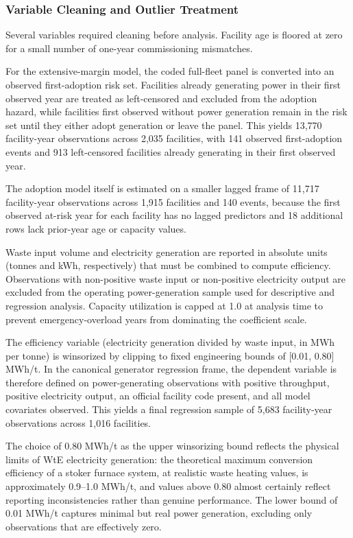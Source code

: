 \documentclass[12pt,a4paper]{article}
\begin{document}
\subsubsection{Variable Cleaning and Outlier Treatment}

Several variables required cleaning before analysis. Facility age is floored at zero for a small number of one-year commissioning mismatches.

For the extensive-margin model, the coded full-fleet panel is converted into an observed first-adoption risk set. Facilities already generating power in their first observed year are treated as left-censored and excluded from the adoption hazard, while facilities first observed without power generation remain in the risk set until they either adopt generation or leave the panel. This yields 13,770 facility-year observations across 2,035 facilities, with 141 observed first-adoption events and 913 left-censored facilities already generating in their first observed year.

The adoption model itself is estimated on a smaller lagged frame of 11,717 facility-year observations across 1,915 facilities and 140 events, because the first observed at-risk year for each facility has no lagged predictors and 18 additional rows lack prior-year age or capacity values.

Waste input volume and electricity generation are reported in absolute units (tonnes and kWh, respectively) that must be combined to compute efficiency. Observations with non-positive waste input or non-positive electricity output are excluded from the operating power-generation sample used for descriptive and regression analysis. Capacity utilization is capped at 1.0 at analysis time to prevent emergency-overload years from dominating the coefficient scale.

The efficiency variable (electricity generation divided by waste input, in MWh per tonne) is winsorized by clipping to fixed engineering bounds of [0.01, 0.80] MWh/t. In the canonical generator regression frame, the dependent variable is therefore defined on power-generating observations with positive throughput, positive electricity output, an official facility code present, and all model covariates observed. This yields a final regression sample of 5,683 facility-year observations across 1,016 facilities.

The choice of 0.80 MWh/t as the upper winsorizing bound reflects the physical limits of WtE electricity generation: the theoretical maximum conversion efficiency of a stoker furnace system, at realistic waste heating values, is approximately 0.9--1.0 MWh/t, and values above 0.80 almost certainly reflect reporting inconsistencies rather than genuine performance. The lower bound of 0.01 MWh/t captures minimal but real power generation, excluding only observations that are effectively zero.
\end{document}
